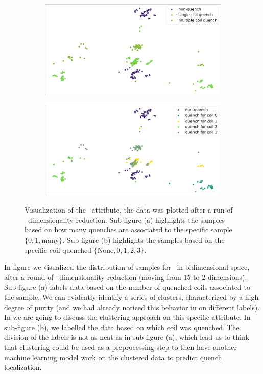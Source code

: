 \begin{figure}[!ht]
	\centering
	\begin{subfigure}{0.6\linewidth}
		\centering
		\includegraphics[width=\linewidth]{img/quench_dist_qlp/single_vs_multiple_An.png}
		\subcaption{}
	\end{subfigure}
	\begin{subfigure}{0.6\linewidth}
		\centering
		\includegraphics[width=\linewidth]{img/quench_dist_qlp_an.png}
		\subcaption{}
	\end{subfigure}
	\caption{Visualization of the \an\ attribute, the data was plotted after a run of \pca\
		dimensionality reduction. Sub-figure (a) highlights the samples based on how many quenches
		are associated to the specific sample $\{0, 1, \text{many}\}$. Sub-figure (b) highlights the
		samples based on the specific coil quenched $\{\text{None}, 0, 1, 2, 3\}$.}\label{fig:an-coilq-dist}
\end{figure}

In figure  we visualized the distribution of samples for \an\ in
bidimensional space, after a round of \pca\ dimensionality reduction (moving from $15$ to $2$
dimensions). Sub-figure (a) labels data based on the number of quenched coils associated to the
sample. We can evidently identify a series of clusters, characterized by a high degree of purity
(and we had already noticed this behavior in \Cref{sec:an} on different labels). In
\Cref{sec:qlp-cluster} we are going to discuss the clustering approach on this specific attribute.
In sub-figure (b), we labelled the data based on which coil was quenched. The division of the labels
is not as neat as in sub-figure (a), which lead us to think that clustering could be used as a
preprocessing step to then have another machine learning model work on the clustered data to predict
quench localization.

